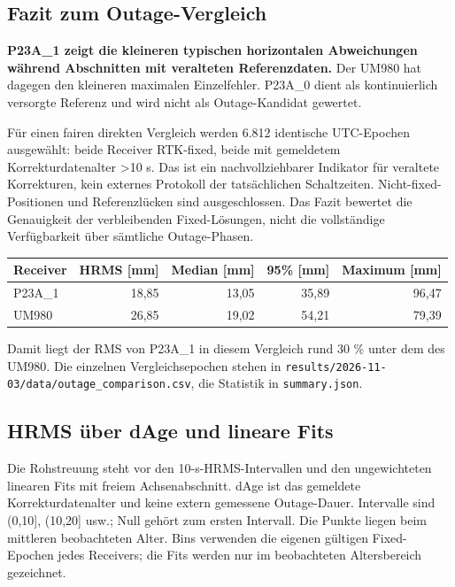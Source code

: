 \documentclass[11pt,a4paper]{article}
\numberwithin{equation}{section}
\numberwithin{figure}{section}
\begin{document}
\subsection{Fazit zum Outage-Vergleich}

\textbf{P23A\_1 zeigt die kleineren typischen horizontalen Abweichungen während Abschnitten mit veralteten Referenzdaten.} Der UM980 hat dagegen den kleineren maximalen Einzelfehler. P23A\_0 dient als kontinuierlich versorgte Referenz und wird nicht als Outage-Kandidat gewertet.

Für einen fairen direkten Vergleich werden 6.812 identische UTC-Epochen ausgewählt: beide Receiver RTK-fixed, beide mit gemeldetem Korrekturdatenalter >10 s. Das ist ein nachvollziehbarer Indikator für veraltete Korrekturen, kein externes Protokoll der tatsächlichen Schaltzeiten. Nicht-fixed-Positionen und Referenzlücken sind ausgeschlossen. Das Fazit bewertet die Genauigkeit der verbleibenden Fixed-Lösungen, nicht die vollständige Verfügbarkeit über sämtliche Outage-Phasen.

\begin{center}\begin{lrbox}{\reporttable}\small\setlength{\tabcolsep}{4pt}\begin{tabular}{lrrrr}\toprule
Receiver & HRMS [mm] & Median [mm] & 95\% [mm] & Maximum [mm]\\\midrule
P23A\_1 & 18,85 & 13,05 & 35,89 & 96,47\\
UM980 & 26,85 & 19,02 & 54,21 & 79,39\\
\bottomrule\end{tabular}\end{lrbox}\ifdim\wd\reporttable>\linewidth\resizebox{\linewidth}{!}{\usebox{\reporttable}}\else\usebox{\reporttable}\fi\end{center}

Damit liegt der RMS von P23A\_1 in diesem Vergleich rund 30 \% unter dem des UM980. Die einzelnen Vergleichsepochen stehen in {\small\texttt{results/\allowbreak{}2026-11-03/\allowbreak{}data/\allowbreak{}outage\_\allowbreak{}comparison.csv}}, die Statistik in {\small\texttt{summary.json}}.

\subsection{HRMS über dAge und lineare Fits}

Die Rohstreuung steht vor den 10-s-HRMS-Intervallen und den ungewichteten linearen Fits mit freiem Achsenabschnitt. dAge ist das gemeldete Korrekturdatenalter und keine extern gemessene Outage-Dauer. Intervalle sind (0,10], (10,20] usw.; Null gehört zum ersten Intervall. Die Punkte liegen beim mittleren beobachteten Alter. Bins verwenden die eigenen gültigen Fixed-Epochen jedes Receivers; die Fits werden nur im beobachteten Altersbereich gezeichnet.
\end{document}
